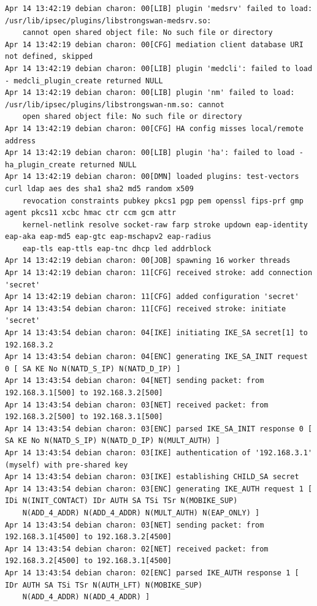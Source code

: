 \documentclass[11pt]{article}
\begin{document}
\begin{lstlisting}
Apr 14 13:42:19 debian charon: 00[LIB] plugin 'medsrv' failed to load: /usr/lib/ipsec/plugins/libstrongswan-medsrv.so:
    cannot open shared object file: No such file or directory
Apr 14 13:42:19 debian charon: 00[CFG] mediation client database URI not defined, skipped
Apr 14 13:42:19 debian charon: 00[LIB] plugin 'medcli': failed to load - medcli_plugin_create returned NULL
Apr 14 13:42:19 debian charon: 00[LIB] plugin 'nm' failed to load: /usr/lib/ipsec/plugins/libstrongswan-nm.so: cannot
    open shared object file: No such file or directory
Apr 14 13:42:19 debian charon: 00[CFG] HA config misses local/remote address
Apr 14 13:42:19 debian charon: 00[LIB] plugin 'ha': failed to load - ha_plugin_create returned NULL
Apr 14 13:42:19 debian charon: 00[DMN] loaded plugins: test-vectors curl ldap aes des sha1 sha2 md5 random x509
    revocation constraints pubkey pkcs1 pgp pem openssl fips-prf gmp agent pkcs11 xcbc hmac ctr ccm gcm attr
    kernel-netlink resolve socket-raw farp stroke updown eap-identity eap-aka eap-md5 eap-gtc eap-mschapv2 eap-radius
    eap-tls eap-ttls eap-tnc dhcp led addrblock
Apr 14 13:42:19 debian charon: 00[JOB] spawning 16 worker threads
Apr 14 13:42:19 debian charon: 11[CFG] received stroke: add connection 'secret'
Apr 14 13:42:19 debian charon: 11[CFG] added configuration 'secret'
Apr 14 13:43:54 debian charon: 11[CFG] received stroke: initiate 'secret'
Apr 14 13:43:54 debian charon: 04[IKE] initiating IKE_SA secret[1] to 192.168.3.2
Apr 14 13:43:54 debian charon: 04[ENC] generating IKE_SA_INIT request 0 [ SA KE No N(NATD_S_IP) N(NATD_D_IP) ]
Apr 14 13:43:54 debian charon: 04[NET] sending packet: from 192.168.3.1[500] to 192.168.3.2[500]
Apr 14 13:43:54 debian charon: 03[NET] received packet: from 192.168.3.2[500] to 192.168.3.1[500]
Apr 14 13:43:54 debian charon: 03[ENC] parsed IKE_SA_INIT response 0 [ SA KE No N(NATD_S_IP) N(NATD_D_IP) N(MULT_AUTH) ]
Apr 14 13:43:54 debian charon: 03[IKE] authentication of '192.168.3.1' (myself) with pre-shared key
Apr 14 13:43:54 debian charon: 03[IKE] establishing CHILD_SA secret
Apr 14 13:43:54 debian charon: 03[ENC] generating IKE_AUTH request 1 [ IDi N(INIT_CONTACT) IDr AUTH SA TSi TSr N(MOBIKE_SUP)
    N(ADD_4_ADDR) N(ADD_4_ADDR) N(MULT_AUTH) N(EAP_ONLY) ]
Apr 14 13:43:54 debian charon: 03[NET] sending packet: from 192.168.3.1[4500] to 192.168.3.2[4500]
Apr 14 13:43:54 debian charon: 02[NET] received packet: from 192.168.3.2[4500] to 192.168.3.1[4500]
Apr 14 13:43:54 debian charon: 02[ENC] parsed IKE_AUTH response 1 [ IDr AUTH SA TSi TSr N(AUTH_LFT) N(MOBIKE_SUP)
    N(ADD_4_ADDR) N(ADD_4_ADDR) ]

\end{lstlisting}
\end{document}
